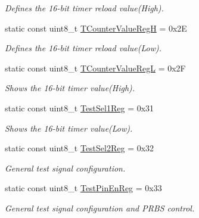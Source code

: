 \begin{DoxyCompactItemize}
\begin{DoxyCompactList}\small\item\em Defines the 16-\/bit timer reload value(\+High). \end{DoxyCompactList}\item 
\mbox{\label{classMFRC522_a457f1df041869fe30a5c01b9a628edd8}} 
static const uint8\+\_\+t \hyperlink{classMFRC522_a457f1df041869fe30a5c01b9a628edd8}{T\+Counter\+Value\+RegH} = 0x2E
\begin{DoxyCompactList}\small\item\em Defines the 16-\/bit timer reload value(\+Low). \end{DoxyCompactList}\item 
\mbox{\label{classMFRC522_addf045e6b7636472c27caec39eeb902b}} 
static const uint8\+\_\+t \hyperlink{classMFRC522_addf045e6b7636472c27caec39eeb902b}{T\+Counter\+Value\+RegL} = 0x2F
\begin{DoxyCompactList}\small\item\em Shows the 16-\/bit timer value(\+High). \end{DoxyCompactList}\item 
\mbox{\label{classMFRC522_a82581733220799c91c85268e5e453519}} 
static const uint8\+\_\+t \hyperlink{classMFRC522_a82581733220799c91c85268e5e453519}{Test\+Sel1\+Reg} = 0x31
\begin{DoxyCompactList}\small\item\em Shows the 16-\/bit timer value(\+Low). \end{DoxyCompactList}\item 
\mbox{\label{classMFRC522_a2254d965da14ff4d6de9fd7f3b214eab}} 
static const uint8\+\_\+t \hyperlink{classMFRC522_a2254d965da14ff4d6de9fd7f3b214eab}{Test\+Sel2\+Reg} = 0x32
\begin{DoxyCompactList}\small\item\em General test signal configuration. \end{DoxyCompactList}\item 
\mbox{\label{classMFRC522_a0b73879826d5984c9ce1c9b8eb7403b2}} 
static const uint8\+\_\+t \hyperlink{classMFRC522_a0b73879826d5984c9ce1c9b8eb7403b2}{Test\+Pin\+En\+Reg} = 0x33
\begin{DoxyCompactList}\small\item\em General test signal configuration and P\+R\+BS control. \end{DoxyCompactList}\item 

\end{DoxyCompactItemize}

